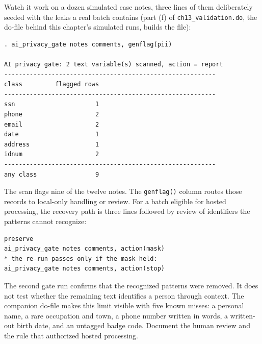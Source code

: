 \documentclass[
    a4paper,
    fontsize=10pt,
    twoside=true,
    numbers=noenddot,
]{kaobook}
\begin{document}
Watch it work on a dozen simulated case notes, three lines of them deliberately seeded with the leaks a real batch contains (part (f) of \texttt{ch13\_validation.do}, the do-file behind this chapter's simulated runs, builds the file):
\par
{\footnotesize
\begin{verbatim}
. ai_privacy_gate notes comments, genflag(pii)

AI privacy gate: 2 text variable(s) scanned, action = report
----------------------------------------------------------
class         flagged rows
----------------------------------------------------------
ssn                      1
phone                    2
email                    2
date                     1
address                  1
idnum                    2
----------------------------------------------------------
any class                9
\end{verbatim}
}
The scan flags nine of the twelve notes. The \texttt{genflag()} column routes those records to local-only handling or review. For a batch eligible for hosted processing, the recovery path is three lines followed by review of identifiers the patterns cannot recognize:
\par
{\footnotesize
\begin{verbatim}
preserve
ai_privacy_gate notes comments, action(mask)
* the re-run passes only if the mask held:
ai_privacy_gate notes comments, action(stop)
\end{verbatim}
}
The second gate run confirms that the recognized patterns were removed. It does not test whether the remaining text identifies a person through context. The companion do-file makes this limit visible with five known misses: a personal name, a rare occupation and town, a phone number written in words, a written-out birth date, and an untagged badge code. Document the human review and the rule that authorized hosted processing.
\end{document}
